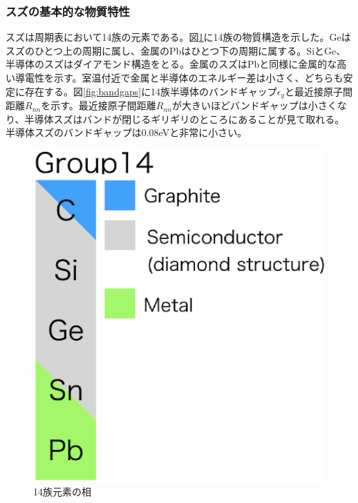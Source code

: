 \subsubsection{スズの基本的な物質特性}
スズは周期表において14族の元素である。図\ref{fig:group14}に14族の物質構造を示した。Geはスズのひとつ上の周期に属し、金属のPbはひとつ下の周期に属する。SiとGe、半導体のスズはダイアモンド構造をとる。金属のスズはPbと同様に金属的な高い導電性を示す。室温付近で金属と半導体のエネルギー差は小さく、どちらも安定に存在する。図\ref{fig:bandgaps}に14族半導体のバンドギャップ$\epsilon_g$と最近接原子間距離$R_{nn}$を示す\cite{Yonezawa}。最近接原子間距離$R_{nn}$が大きいほどバンドギャップは小さくなり、半導体スズはバンドが閉じるギリギリのところにあることが見て取れる。半導体スズのバンドギャップは0.08eVと非常に小さい。
\begin{figure}[!h]
 \begin{minipage}{0.4\hsize}
  \begin{center}
   \includegraphics[width=\hsize]{Introduction/group14.eps}
  \end{center}
  \caption{14族元素の相}
  \label{fig:group14}
 \end{minipage}
 \begin{minipage}{0.6\hsize}

\end{minipage}
\end{figure}
